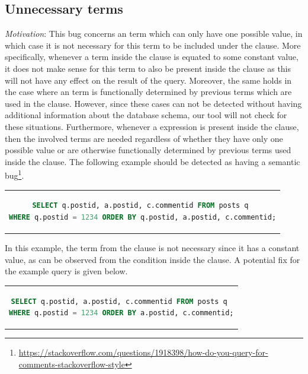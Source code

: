 \subsection{Unnecessary  terms}
\emph{Motivation}: This bug concerns an  term which can only have one possible value, in which case it is not necessary for this term to be included under the  clause. More specifically, whenever a term inside the  clause is equated to some constant value, it does not make sense for this term to also be present inside the  clause as this will not have any effect on the result of the query. Moreover, the same holds in the case where an  term is functionally determined by previous terms which are used in the clause. However, since these cases can not be detected without having additional information about the database schema, our tool will not check for these situations. Furthermore, whenever a  expression is present inside the  clause, then the involved terms are needed regardless of whether they have only one possible value or are otherwise functionally determined by previous terms used inside the clause. The following example should be detected as having a semantic bug\footnote{\url{https://stackoverflow.com/questions/1918398/how-do-you-query-for-comments-stackoverflow-style}}.

\begin{center}
\begin{tabular}{c}
\begin{lstlisting}[language=SQL]
SELECT q.postid, a.postid, c.commentid FROM posts q 
WHERE q.postid = 1234 ORDER BY q.postid, a.postid, c.commentid;
\end{lstlisting}
\end{tabular}
\end{center}

In this example, the  term from the  clause is not necessary since it has a constant value, as can be observed from the  condition inside the  clause. A potential fix for the example query is given below.

\begin{center}
\begin{tabular}{c}
\begin{lstlisting}[language=SQL]
SELECT q.postid, a.postid, c.commentid FROM posts q 
WHERE q.postid = 1234 ORDER BY a.postid, c.commentid;
\end{lstlisting}
\end{tabular}
\end{center}

